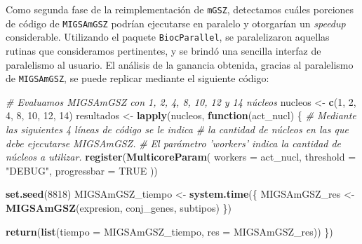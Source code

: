 \documentclass[12pt,twoside]{reedthesis}
\newenvironment{Shaded}{\begin{snugshade}}{\end{snugshade}}
\newcommand{\CommentTok}[1]{\textcolor[rgb]{0.56,0.35,0.01}{\textit{#1}}}
\newcommand{\ControlFlowTok}[1]{\textcolor[rgb]{0.13,0.29,0.53}{\textbf{#1}}}
\newcommand{\DataTypeTok}[1]{\textcolor[rgb]{0.13,0.29,0.53}{#1}}
\newcommand{\DecValTok}[1]{\textcolor[rgb]{0.00,0.00,0.81}{#1}}
\newcommand{\KeywordTok}[1]{\textcolor[rgb]{0.13,0.29,0.53}{\textbf{#1}}}
\newcommand{\NormalTok}[1]{#1}
\newcommand{\OtherTok}[1]{\textcolor[rgb]{0.56,0.35,0.01}{#1}}
\newcommand{\StringTok}[1]{\textcolor[rgb]{0.31,0.60,0.02}{#1}}
\begin{document}
Como segunda fase de la reimplementación de \texttt{mGSZ}, detectamos cuáles porciones de código de \texttt{MIGSAmGSZ} podrían ejecutarse en paralelo y otorgarían un \emph{speedup} considerable. Utilizando el paquete \texttt{BiocParallel}, se paralelizaron aquellas rutinas que consideramos pertinentes, y se brindó una sencilla interfaz de paralelismo al usuario. El análisis de la ganancia obtenida, gracias al paralelismo de \texttt{MIGSAmGSZ}, se puede replicar mediante el siguiente código:
\begin{Shaded}
\begin{Highlighting}[]
\CommentTok{# Evaluamos MIGSAmGSZ con 1, 2, 4, 8, 10, 12 y 14 núcleos}
\NormalTok{nucleos <-}\StringTok{ }\KeywordTok{c}\NormalTok{(}\DecValTok{1}\NormalTok{, }\DecValTok{2}\NormalTok{, }\DecValTok{4}\NormalTok{, }\DecValTok{8}\NormalTok{, }\DecValTok{10}\NormalTok{, }\DecValTok{12}\NormalTok{, }\DecValTok{14}\NormalTok{)}
\NormalTok{resultados <-}\StringTok{ }\KeywordTok{lapply}\NormalTok{(nucleos, }\ControlFlowTok{function}\NormalTok{(act_nucl) \{}
  \CommentTok{# Mediante las siguientes 4 líneas de código se le indica}
  \CommentTok{# la cantidad de núcleos en las que debe ejecutarse MIGSAmGSZ.}
  \CommentTok{# El parámetro 'workers' indica la cantidad de núcleos a utilizar.}
  \KeywordTok{register}\NormalTok{(}\KeywordTok{MulticoreParam}\NormalTok{(}
    \DataTypeTok{workers =}\NormalTok{ act_nucl, }\DataTypeTok{threshold =} \StringTok{"DEBUG"}\NormalTok{,}
    \DataTypeTok{progressbar =} \OtherTok{TRUE}
\NormalTok{  ))}

  \KeywordTok{set.seed}\NormalTok{(}\DecValTok{8818}\NormalTok{)}
\NormalTok{  MIGSAmGSZ_tiempo <-}\StringTok{ }\KeywordTok{system.time}\NormalTok{(\{}
\NormalTok{    MIGSAmGSZ_res <-}\StringTok{ }\KeywordTok{MIGSAmGSZ}\NormalTok{(expresion, conj_genes, subtipos)}
\NormalTok{  \})}

  \KeywordTok{return}\NormalTok{(}\KeywordTok{list}\NormalTok{(}\DataTypeTok{tiempo =}\NormalTok{ MIGSAmGSZ_tiempo, }\DataTypeTok{res =}\NormalTok{ MIGSAmGSZ_res))}
\NormalTok{\})}
\end{Highlighting}
\end{Shaded}
\end{document}
